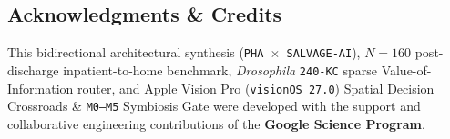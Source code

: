 \documentclass[10pt,twocolumn,letterpaper]{article}
\begin{document}
\subsection*{Acknowledgments \& Credits}
This bidirectional architectural synthesis (\texttt{PHA $\times$ SALVAGE-AI}), $N = 160$ post-discharge inpatient-to-home benchmark, \textit{Drosophila} \texttt{240-KC} sparse Value-of-Information router, and Apple Vision Pro (\texttt{visionOS 27.0}) Spatial Decision Crossroads \& \texttt{M0--M5} Symbiosis Gate were developed with the support and collaborative engineering contributions of the \textbf{Google Science Program}.



\end{document}
